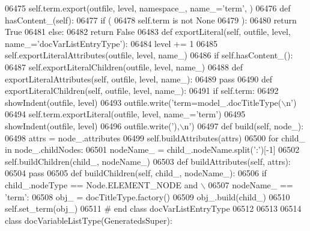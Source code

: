 \begin{DoxyCode}
{{{{{{{{{{{{{{{{{{{{{{{{{{{{{{{{{{{{{{{{{{{{{{{{{{{{{{{{{{{{{{{{{{{{{{{{{{{{{{{{{{{{{{{{{{{{{{{{{{{{{{{{{{{{{{{{{{{{{{{{{{{{{{{{{{{{{{{{{{{{{{{{{{{{{{{{{{{{{{{{{{{{{{{{{{{{{{{{{{{{{{{{{{{{{{{{{{{{{{{{{{{{{{{{{{{{{{{{{{{{{{{{{{{{{{{{{{{{{{{{{{{{{{{{{{{{{{{{{{{{{{{{{{{{{{{{{{{{{{{{{{{{{{{{{{{{{{{{{{{{{{{{{{{{{{{{{{{{{{{{{{{{{{{{{{{{{{{{{{{{{{{{{{{{{{{{{{{{{{{{{{{{{{{{{{{{{{{{{{{{{{{{{{{{{{{{{{{{{{06475             self.term.export(outfile, level, namespace\_, name\_=\textcolor{stringliteral}{'term'}, )
06476     \textcolor{keyword}{def }hasContent_(self):
06477         \textcolor{keywordflow}{if} (
06478             self.term \textcolor{keywordflow}{is} \textcolor{keywordflow}{not} \textcolor{keywordtype}{None}
06479             ):
06480             \textcolor{keywordflow}{return} \textcolor{keyword}{True}
06481         \textcolor{keywordflow}{else}:
06482             \textcolor{keywordflow}{return} \textcolor{keyword}{False}
06483     \textcolor{keyword}{def }exportLiteral(self, outfile, level, name\_='docVarListEntryType'):
06484         level += 1
06485         self.exportLiteralAttributes(outfile, level, name\_)
06486         \textcolor{keywordflow}{if} self.hasContent_():
06487             self.exportLiteralChildren(outfile, level, name\_)
06488     \textcolor{keyword}{def }exportLiteralAttributes(self, outfile, level, name\_):
06489         \textcolor{keywordflow}{pass}
06490     \textcolor{keyword}{def }exportLiteralChildren(self, outfile, level, name\_):
06491         \textcolor{keywordflow}{if} self.term:
06492             showIndent(outfile, level)
06493             outfile.write(\textcolor{stringliteral}{'term=model\_.docTitleType(\(\backslash\)n'})
06494             self.term.exportLiteral(outfile, level, name\_=\textcolor{stringliteral}{'term'})
06495             showIndent(outfile, level)
06496             outfile.write(\textcolor{stringliteral}{'),\(\backslash\)n'})
06497     \textcolor{keyword}{def }build(self, node\_):
06498         attrs = node\_.attributes
06499         self.buildAttributes(attrs)
06500         \textcolor{keywordflow}{for} child\_ \textcolor{keywordflow}{in} node\_.childNodes:
06501             nodeName\_ = child\_.nodeName.split(\textcolor{stringliteral}{':'})[-1]
06502             self.buildChildren(child\_, nodeName\_)
06503     \textcolor{keyword}{def }buildAttributes(self, attrs):
06504         \textcolor{keywordflow}{pass}
06505     \textcolor{keyword}{def }buildChildren(self, child\_, nodeName\_):
06506         \textcolor{keywordflow}{if} child\_.nodeType == Node.ELEMENT\_NODE \textcolor{keywordflow}{and} \(\backslash\)
06507             nodeName\_ == \textcolor{stringliteral}{'term'}:
06508             obj\_ = docTitleType.factory()
06509             obj\_.build(child\_)
06510             self.set\_term(obj\_)
06511 \textcolor{comment}{# end class docVarListEntryType}
06512 
06513 
06514 \textcolor{keyword}{class }docVariableListType(GeneratedsSuper):
}}}}}}}}}}}}}}}}}}}}}}}}}}}}}}}}}}}}}}}}}}}}}}}}}}}}}}}}}}}}}}}}}}}}}}}}}}}}}}}}}}}}}}}}}}}}}}}}}}}}}}}}}}}}}}}}}}}}}}}}}}}}}}}}}}}}}}}}}}}}}}}}}}}}}}}}}}}}}}}}}}}}}}}}}}}}}}}}}}}}}}}}}}}}}}}}}}}}}}}}}}}}}}}}}}}}}}}}}}}}}}}}}}}}}}}}}}}}}}}}}}}}}}}}}}}}}}}}}}}}}}}}}}}}}}}}}}}}}}}}}}}}}}}}}}}}}}}}}}}}}}}}}}}}}}}}}}}}}}}}}}}}}}}}}}}}}}}}}}}}}}}}}}}}}}}}}}}}}}}}}}}}}}}}}}}}}}}}}}}}}}}}}}}}}}}}}}}}}}
\end{DoxyCode}
